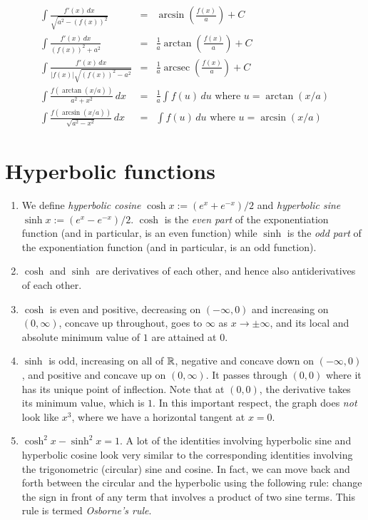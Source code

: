 \documentclass[10pt]{amsart}
\begin{document}
\begin{eqnarray*}
  \int \frac{f'(x) \, dx}{\sqrt{a^2 - (f(x))^2}} & = & \arcsin\left(\frac{f(x)}{a}\right) + C\\
  \int \frac{f'(x) \, dx}{(f(x))^2 + a^2} & = & \frac{1}{a}\arctan\left(\frac{f(x)}{a}\right) + C\\
  \int \frac{f'(x) \, dx}{|f(x)|\sqrt{(f(x))^2 - a^2}} & = & \frac{1}{a} \operatorname{arcsec}\left(\frac{f(x)}{a}\right) + C\\
  \int \frac{f(\arctan (x/a))}{a^2 + x^2}  \, dx& = & \frac{1}{a} \int f(u) \, du \text{ where } u = \arctan(x/a)\\
  \int \frac{f(\arcsin(x/a))}{\sqrt{a^2 - x^2}} \, dx& = & \int f(u) \, du \text{ where } u = \arcsin(x/a)
\end{eqnarray*}

\section{Hyperbolic functions}

\begin{enumerate}
\item We define {\em hyperbolic cosine} $\cosh x := (e^x + e^{-x})/2$
  and {\em hyperbolic sine} $\sinh x := (e^x - e^{-x})/2$. $\cosh$ is
  the {\em even part} of the exponentiation function (and in
  particular, is an even function) while $\sinh$ is the {\em odd part}
  of the exponentiation function (and in particular, is an odd
  function).
\item $\cosh$ and $\sinh$ are derivatives of each other, and hence
  also antiderivatives of each other.
\item $\cosh$ is even and positive, decreasing on $(-\infty,0)$ and
  increasing on $(0,\infty)$, concave up throughout, goes to $\infty$
  as $x \to \pm \infty$, and its local and absolute minimum value of
  $1$ are attained at $0$.
\item $\sinh$ is odd, increasing on all of $\mathbb{R}$, negative and concave
  down on $(-\infty,0)$, and positive and concave up on
  $(0,\infty)$. It passes through $(0,0)$ where it has its unique
  point of inflection. Note that at $(0,0)$, the derivative takes its
  minimum value, which is $1$. In this important respect, the graph
  does {\em not} look like $x^3$, where we have a horizontal tangent
  at $x = 0$.
\item $\cosh^2 x - \sinh^2 x = 1$. A lot of the identities involving
  hyperbolic sine and hyperbolic cosine look very similar to the
  corresponding identities involving the trigonometric (circular) sine
  and cosine. In fact, we can move back and forth between the circular
  and the hyperbolic using the following rule: change the sign in
  front of any term that involves a product of two sine terms. This
  rule is termed {\em Osborne's rule}.
\end{enumerate}
\end{document}

